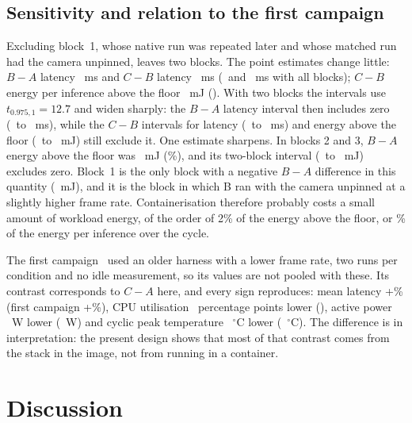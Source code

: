\documentclass[10pt,journal,compsoc]{IEEEtran}
\begin{document}
\subsection{Sensitivity and relation to the first campaign}\label{sec:sens}
Excluding block~1, whose native run was repeated later and whose matched run had the camera unpinned, leaves two blocks. The point estimates change little: $B-A$ latency \LatMeanBAsens~ms and $C-B$ latency \LatMeanCBsens~ms (\LatMeanBA\ and \LatMeanCB~ms with all blocks); $C-B$ energy per inference above the floor \EIncCBsens~mJ (\EIncCB). With two blocks the intervals use $t_{0.975,1}=12.7$ and widen sharply: the $B-A$ latency interval then includes zero (\LatMeanBAsenslo\ to \LatMeanBAsenshi~ms), while the $C-B$ intervals for latency (\LatMeanCBsenslo\ to \LatMeanCBsenshi~ms) and energy above the floor (\EIncCBsenslo\ to \EIncCBsenshi~mJ) still exclude it. One estimate sharpens. In blocks 2 and 3, $B-A$ energy above the floor was \EIncBAsens~mJ (\EIncBAsenspct\%), and its two-block interval (\EIncBAsenslo\ to \EIncBAsenshi~mJ) excludes zero. Block~1 is the only block with a negative $B-A$ difference in this quantity (\EIncBAblkOne~mJ), and it is the block in which B ran with the camera unpinned at a slightly higher frame rate. Containerisation therefore probably costs a small amount of workload energy, of the order of 2\% of the energy above the floor, or \ECycBAsenspct\% of the energy per inference over the cycle.

The first campaign~\cite{lin2026datasetv1} used an older harness with a lower frame rate, two runs per condition and no idle measurement, so its values are not pooled with these. Its contrast corresponds to $C-A$ here, and every sign reproduces: mean latency +\LatMeanCApctabs\% (first campaign +\FirstLatPct\%), CPU utilisation \CPUCAabs\ percentage points lower (\FirstCPUpp), active power \PActCAabs~W lower (\FirstPW~W) and cyclic peak temperature \TPeakCAabs~$^\circ$C lower (\FirstPeak~$^\circ$C). The difference is in interpretation: the present design shows that most of that contrast comes from the stack in the image, not from running in a container.

\section{Discussion}\label{sec:discussion}
\end{document}
